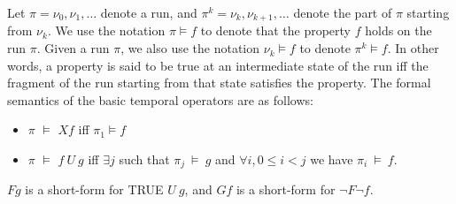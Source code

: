 \noindent
Let $\pi = \nu_0, \nu_1, \ldots$ denote a run, and 
$\pi^k = \nu_k, \nu_{k+1}, \ldots$ denote the part of $\pi$ starting from
$\nu_k$. We use the notation $\pi \models f$ to denote that the property
$f$ holds on the run $\pi$. Given a run $\pi$, we also use the notation
$\nu_k \models f$ to denote $\pi^k \models f$. In other words, a property is
said to be true at an intermediate state of the run iff the fragment of the
run starting from that state satisfies the property. The formal semantics of
the basic temporal operators are as follows:
\begin{itemize}

\item $\pi$ $\models$ $Xf$ iff $\pi_1 \models f$
\item $\pi$ $\models$ $f\ U\ g$ iff $\exists j$ such that 
	$\pi_j\ \models\ g$ and $\forall i, 0 \leq i < j$ we have
	$\pi_i\ \models\ f$.

\end{itemize}
$Fg$ is a short-form for TRUE $U\ g$, and $Gf$ is a short-form for
$\neg F \neg f$.

